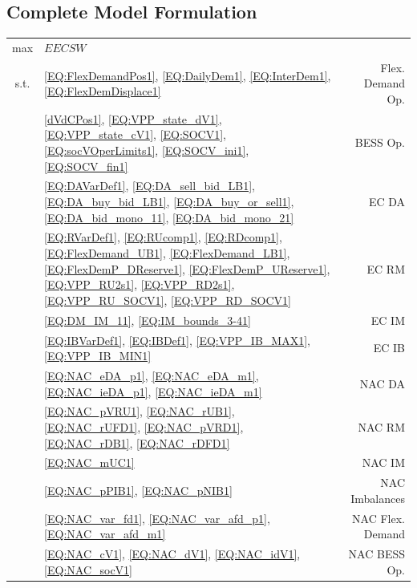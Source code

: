 \subsection{Complete Model Formulation}
\label{SEC:CompleteModelFormulation1}

{\small
\begin{tabularx}{\textwidth}{c >{\raggedright\arraybackslash}X r}

max & $EECSW$ & \\[0.5em]

s.t. & \eqref{EQ:FlexDemandPos1}, \eqref{EQ:DailyDem1}, \eqref{EQ:InterDem1}, \eqref{EQ:FlexDemDisplace1} & Flex. Demand Op. \\[0.2em]

& \eqref{dVdCPos1}, \eqref{EQ:VPP_state_dV1}, \eqref{EQ:VPP_state_cV1}, \eqref{EQ:SOCV1}, \eqref{EQ:socVOperLimits1}, \eqref{EQ:SOCV_ini1}, \eqref{EQ:SOCV_fin1} & BESS Op. \\[0.2em]

& \eqref{EQ:DAVarDef1}, \eqref{EQ:DA_sell_bid_LB1}, \eqref{EQ:DA_buy_bid_LB1}, \eqref{EQ:DA_buy_or_sell1}, \eqref{EQ:DA_bid_mono_11}, \eqref{EQ:DA_bid_mono_21} & EC DA \\[0.2em]

& \eqref{EQ:RVarDef1}, \eqref{EQ:RUcomp1}, \eqref{EQ:RDcomp1}, \eqref{EQ:FlexDemand_UB1}, \eqref{EQ:FlexDemand_LB1}, \eqref{EQ:FlexDemP_DReserve1}, \eqref{EQ:FlexDemP_UReserve1}, \eqref{EQ:VPP_RU2s1}, \eqref{EQ:VPP_RD2s1}, \eqref{EQ:VPP_RU_SOCV1}, \eqref{EQ:VPP_RD_SOCV1} & EC RM \\[0.2em]

& \eqref{EQ:DM_IM_11}, \eqref{EQ:IM_bounds_3-41} & EC IM \\[0.2em]

& \eqref{EQ:IBVarDef1}, \eqref{EQ:IBDef1}, \eqref{EQ:VPP_IB_MAX1}, \eqref{EQ:VPP_IB_MIN1} & EC IB \\[0.2em]

& \eqref{EQ:NAC_eDA_p1}, \eqref{EQ:NAC_eDA_m1}, \eqref{EQ:NAC_ieDA_p1}, \eqref{EQ:NAC_ieDA_m1} & NAC DA \\[0.2em]

& \eqref{EQ:NAC_pVRU1}, \eqref{EQ:NAC_rUB1}, \eqref{EQ:NAC_rUFD1}, \eqref{EQ:NAC_pVRD1}, \eqref{EQ:NAC_rDB1}, \eqref{EQ:NAC_rDFD1} & NAC RM \\[0.2em]

& \eqref{EQ:NAC_mUC1} & NAC IM \\[0.2em]

& \eqref{EQ:NAC_pPIB1}, \eqref{EQ:NAC_pNIB1} & NAC Imbalances \\[0.2em]

& \eqref{EQ:NAC_var_fd1}, \eqref{EQ:NAC_var_afd_p1}, \eqref{EQ:NAC_var_afd_m1} & NAC Flex. Demand \\[0.2em]

& \eqref{EQ:NAC_cV1}, \eqref{EQ:NAC_dV1}, \eqref{EQ:NAC_idV1}, \eqref{EQ:NAC_socV1} & NAC BESS Op. \\

\end{tabularx}
}


